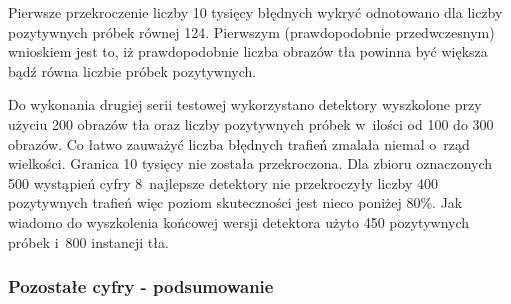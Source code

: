 \begin{center}
\end{center}

Pierwsze przekroczenie liczby 10 tysięcy błędnych wykryć odnotowano dla
liczby pozytywnych próbek równej 124. Pierwszym (prawdopodobnie przedwczesnym)
wnioskiem jest to, iż prawdopodobnie liczba obrazów tła powinna być
większa bądź równa liczbie próbek pozytywnych.

\begin{center}
\end{center}

Do wykonania drugiej serii testowej wykorzystano detektory
wyszkolone przy użyciu 200 obrazów tła oraz liczby pozytywnych 
próbek w~ilości od 100 do 300 obrazów. Co łatwo zauważyć liczba 
błędnych trafień zmalała niemal o~rząd wielkości. Granica 10 tysięcy
nie została przekroczona. Dla zbioru oznaczonych 500 wystąpień cyfry 
8~najlepsze detektory nie przekroczyły liczby 400 pozytywnych trafień
więc poziom skuteczności jest nieco poniżej 80\%. Jak wiadomo
do wyszkolenia końcowej wersji detektora użyto 450 pozytywnych próbek
i~800 instancji tła.

\subsubsection{Pozostałe cyfry - podsumowanie}

